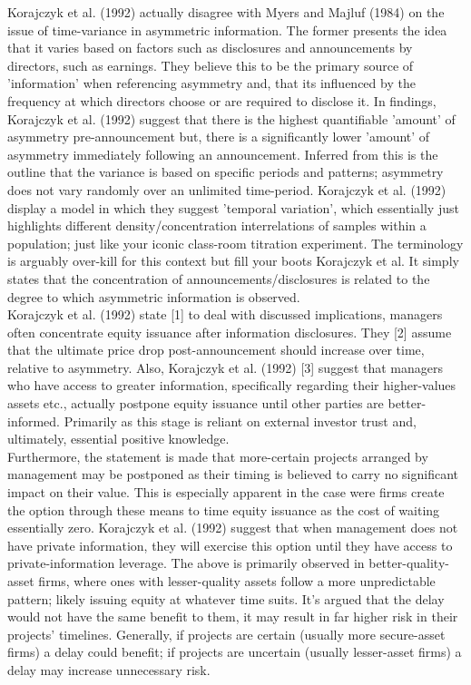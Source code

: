 \documentclass[11pt, english]{article}
\begin{document}
	Korajczyk et al. (1992) actually disagree with Myers and Majluf (1984) on the issue of time-variance in asymmetric information. The former presents the idea that it varies based on factors such as disclosures and announcements by directors, such as earnings. They believe this to be the primary source of 'information' when referencing asymmetry and, that its influenced by the frequency at which directors choose or are required to disclose it. In findings, Korajczyk et al. (1992) suggest that there is the highest quantifiable 'amount' of asymmetry pre-announcement but, there is a significantly lower 'amount' of asymmetry immediately following an announcement. Inferred from this is the outline that the variance is based on specific periods and patterns; asymmetry does not vary randomly over an unlimited time-period. Korajczyk et al. (1992) display a model in which they suggest 'temporal variation', which essentially just highlights different density/concentration interrelations of samples within a population; just like your iconic class-room titration experiment. The terminology is arguably over-kill for this context but fill your boots Korajczyk et al. It simply states that the concentration of announcements/disclosures is related to the degree to which asymmetric information is observed.\\

	Korajczyk et al. (1992) state [1] to deal with discussed implications, managers often concentrate equity issuance after information disclosures. They [2] assume that the ultimate price drop post-announcement should increase over time, relative to asymmetry. Also, Korajczyk et al. (1992) [3] suggest that managers who have access to greater information, specifically regarding their higher-values assets etc., actually postpone equity issuance until other parties are better- informed. Primarily as this stage is reliant on external investor trust and, ultimately, essential positive knowledge.\\

	Furthermore, the statement is made that more-certain projects arranged by management may be postponed as their timing is believed to carry no significant impact on their value. This is especially apparent in the case were firms create the option through these means to time equity issuance as the cost of waiting essentially zero. Korajczyk et al. (1992) suggest that when management does not have private information, they will exercise this option until they have access to private-information leverage. The above is primarily observed in better-quality- asset firms, where ones with lesser-quality assets follow a more unpredictable pattern; likely issuing equity at whatever time suits. It's argued that the delay would not have the same benefit to them, it may result in far higher risk in their projects' timelines. Generally, if projects are certain (usually more secure-asset firms) a delay could benefit; if projects are uncertain (usually lesser-asset firms) a delay may increase unnecessary risk.
\end{document}
